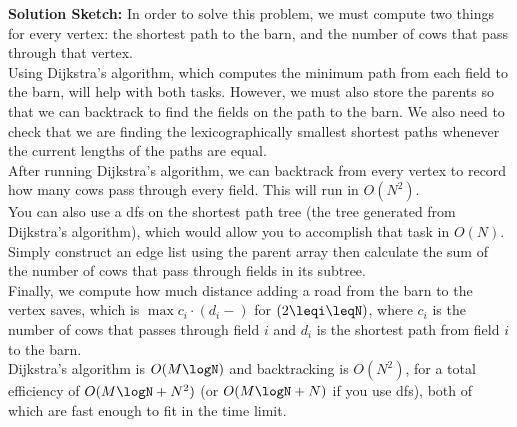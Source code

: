 \documentclass{article}
\begin{document}
\textbf{Solution Sketch:}
In order to solve this problem, we must compute two things for every vertex: the shortest path to the barn, and the number of cows that pass through that vertex.
\\
Using Dijkstra’s algorithm, which computes the minimum path from each field to the barn, will help with both tasks. However, we must also store the parents so that we can backtrack to find the fields on the path to the barn. We also need to check that we are finding the lexicographically smallest shortest paths whenever the current lengths of the paths are equal.
\\
After running Dijkstra’s algorithm, we can backtrack from every vertex to record how many cows pass through every field. This will run in $O(N^2)$.
\\
You can also use a dfs on the shortest path tree (the tree generated from Dijkstra’s algorithm), which would allow you to accomplish that task in $O(N)$. Simply construct an edge list using the parent array then calculate the sum of the number of cows that pass through fields in its subtree.
\\
Finally, we compute how much distance adding a road from the barn to the vertex saves, which is $\max c_i⋅(d_i−)$ for $(2\leqi\leqN)$, where $c_i$ is the number of cows that passes through field $i$ and $d_i$ is the shortest path from field $i$ to the barn.
\\
Dijkstra’s algorithm is $O(M\logN)$ and backtracking is $O(N^2)$, for a total efficiency of $O(M\logN+N^2)$ (or $O(M\logN+N)$ if you use dfs), both of which are fast enough to fit in the time limit.
\end{document}
